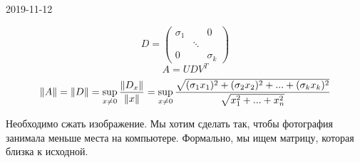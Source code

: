 \documentclass[main.tex]{subfiles}
\begin{document}
\begin{lect}{2019-11-12}
    \begin{Proof}
        \[D = \begin{pmatrix}
            \sigma_1 & & 0\\
                     &\ddots& \\
            0 & & \sigma_k
        \end{pmatrix}\]
        \[A = UDV^T\]
        \[\lVert A \rVert = \lVert D \rVert = \sup_{x \neq 0} \frac{\lVert D_x \rVert}{\lVert x \rVert} = 
        \sup_{x \neq 0} \frac{\sqrt{(\sigma_1 x_1)^2 + (\sigma_2 x_2)^2 + ... + 
    (\sigma_k x_k)^2}}{\sqrt{x_1^2 + ... + x_n^2}} \]
    \end{Proof}

    \begin{task}
        Необходимо сжать изображение. Мы хотим сделать так, чтобы 
        фотография занимала меньше места на компьютере. Формально, мы ищем 
        матрицу, которая близка к исходной.
    \end{task}


\end{lect}
\end{document}
